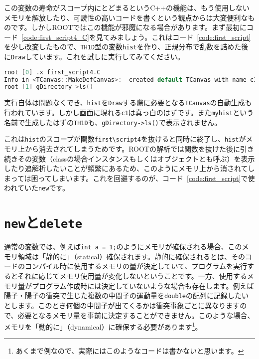 \begin{NoFloat}

\end{NoFloat}

この変数の寿命がスコープ内にとどまるというC++の機能は、もう使用しないメモリを解放したり、可読性の高いコードを書くという観点からは大変便利なものです。しかしROOTではこの機能が邪魔になる場合があります。まず最初にコード~\ref{code:first_script4_C}を見てみましょう。これはコード~\ref{code:first_script}を少し改変したもので、\texttt{TH1D}型の変数\texttt{hist}を作り、正規分布で乱数を詰めた後に\texttt{Draw}しています。これを試しに実行してみてください。

\begin{lstlisting}[language=c++]
root [0] .x first_script4.C
Info in <TCanvas::MakeDefCanvas>:  created default TCanvas with name c1
root [1] gDirectory->ls()
\end{lstlisting}

実行自体は問題なくでき、\texttt{hist}を\texttt{Draw}する際に必要となる\texttt{TCanvas}の自動生成も行われています。しかし画面に現れる\texttt{c1}は真っ白のはずです。また\texttt{myhist}という名前で生成したはずの\texttt{TH1D}も、\texttt{gDirectory->ls()}で表示されません。

これは\texttt{hist}のスコープが関数\texttt{first\textbackslash{}script4}を抜けると同時に終了し、\texttt{hist}がメモリ上から消去されてしまうためです。ROOTの解析では関数を抜けた後に引き続きその変数（classの場合インスタンスもしくはオブジェクトとも呼ぶ）を表示したり追解析したいことが頻繁にあるため、このようにメモリ上から消されてしまっては困ってしまいます。これを回避するのが、コード~\ref{code:first_script}で使われていた\texttt{new}です。

\section{\texttt{new}と\texttt{delete}}
\label{sec:new_delete}

通常の変数では、例えば\texttt{int a = 1;}のようにメモリが確保される場合、このメモリ領域は「静的に」（statical）確保されます。静的に確保されるとは、そのコードのコンパイル時に使用するメモリの量が決定していて、プログラムを実行するとそれに応じてメモリ使用量が変化しないということです。一方、使用するメモリ量がプログラム作成時には決定していないような場合も存在します。例えば陽子・陽子の衝突で生じた複数の中間子の運動量を\texttt{double}の配列に記録したいとします。このとき何個の中間子が出てくるかは衝突事象ごとに異なりますので、必要となるメモリ量を事前に決定することができません。このような場合、メモリを「動的に」（dynamical）に確保する必要があります\footnote{あくまで例なので、実際にはこのようなコードは書かないと思います。}。

